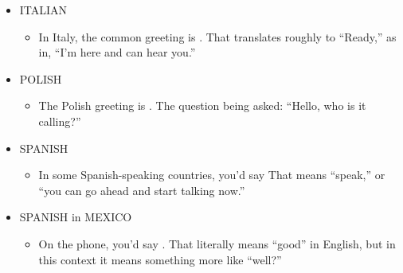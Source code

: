 \documentclass[a4paper,landscape,headrule,footrule,xetex]{foils}
\begin{document}
  \begin{itemize}
\item ITALIAN
  \begin{itemize}
  \item In Italy, the common greeting is . That translates roughly to “Ready,” as in, ``I'm here and can hear you.''
  \end{itemize}
\item   POLISH
 \begin{itemize}
  \item The Polish greeting is . The question being asked: ``Hello, who is it calling?''
  \end{itemize}

\item    SPANISH
\begin{itemize}
  \item In some Spanish-speaking countries, you'd say  That means ``speak,'' or ``you can go ahead and start talking now.''
  \end{itemize}
\item   SPANISH in MEXICO
\begin{itemize}
  \item  On the phone, you'd say . That literally means ``good'' in English, but in this context it means something more like ``well?''
  \end{itemize}
\end{itemize}



\end{document}
